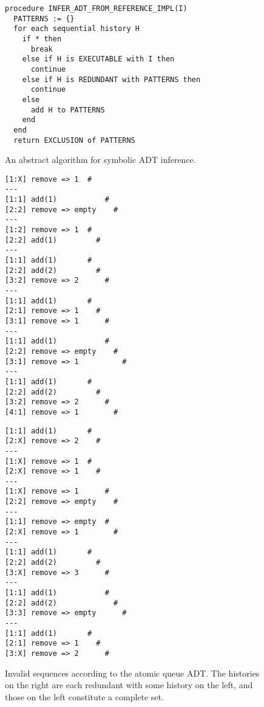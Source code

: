 \begin{figure}
  \begin{verbatim}
procedure INFER_ADT_FROM_REFERENCE_IMPL(I)
  PATTERNS := {}
  for each sequential history H
    if * then
      break
    else if H is EXECUTABLE with I then
      continue
    else if H is REDUNDANT with PATTERNS then
      continue
    else
      add H to PATTERNS
    end
  end
  return EXCLUSION of PATTERNS
  \end{verbatim}
  \caption{An abstract algorithm for symbolic ADT inference.}
  \label{fig:abstract}
\end{figure}

\begin{figure}
  \begin{minipage}[b]{0.49\linewidth}
    \begin{verbatim}
[1:X] remove => 1  #
---
[1:1] add(1)           #
[2:2] remove => empty    #
---
[1:2] remove => 1  #
[2:2] add(1)         #
---
[1:1] add(1)       #
[2:2] add(2)         #
[3:2] remove => 2      #
---
[1:1] add(1)       #
[2:1] remove => 1    #
[3:1] remove => 1      #
---
[1:1] add(1)           #
[2:2] remove => empty    #
[3:1] remove => 1          #
---
[1:1] add(1)       #
[2:2] add(2)         #
[3:2] remove => 2      #
[4:1] remove => 1        #
    \end{verbatim}
  \end{minipage}
  \hfill
  \begin{minipage}[b]{0.49\linewidth}
    \begin{verbatim}
[1:1] add(1)       #
[2:X] remove => 2    #
---
[1:X] remove => 1  #
[2:X] remove => 1    #
---
[1:X] remove => 1      #
[2:2] remove => empty    #
---
[1:1] remove => empty  #
[2:X] remove => 1        #
---
[1:1] add(1)       #
[2:2] add(2)         #
[3:X] remove => 3      #
---
[1:1] add(1)           #
[2:2] add(2)             #
[3:3] remove => empty      #
---
[1:1] add(1)       #
[2:1] remove => 1    #
[3:X] remove => 2      #
    \end{verbatim}
  \end{minipage}
  \caption{Invalid sequences according to the atomic queue ADT. The histories
  on the right are each redundant with some history on the left, and those on
  the left constitute a complete set.}
  \label{fig:patterns}
\end{figure}

